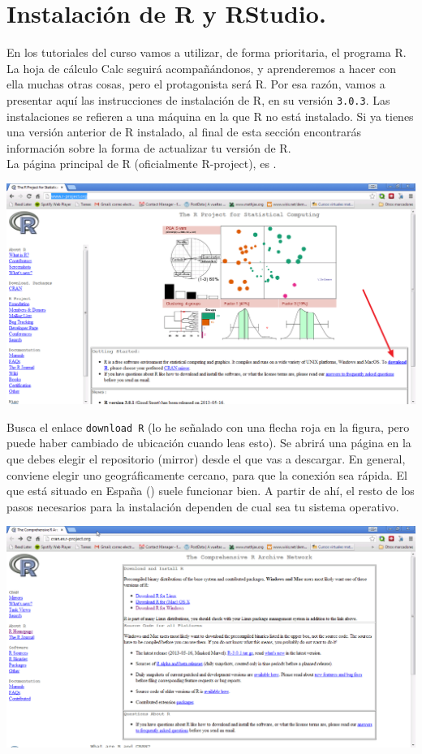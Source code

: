 \documentclass[10pt,a4paper]{article}\usepackage[]{graphicx}\usepackage[]{color}
\newcounter {cont01}
\begin{document}
\section{Instalación de R y RStudio.}

En los tutoriales del curso vamos a utilizar, de forma prioritaria, el programa R. La hoja de
cálculo Calc seguirá acompañándonos, y aprenderemos a hacer con ella muchas otras cosas, pero el
protagonista será R. Por esa razón, vamos a presentar aquí las instrucciones de instalación de R,
en su versión {\tt 3.0.3}. Las instalaciones se refieren a una máquina en la que R {\sf no está
instalado}.
Si ya tienes una versión anterior de R instalado, al final de esta sección encontrarás información sobre la forma de actualizar tu versión de R. \quad\\
La página principal de R (oficialmente R-project), es
.
    \begin{center}
    \includegraphics[width=15cm]{../fig/Tut00-35.png}
    \end{center}
Busca el enlace {\tt download R} (lo he señalado con una flecha roja en la figura, pero puede haber
cambiado de ubicación cuando leas esto). Se abrirá una página en la que debes elegir el repositorio
(mirror) desde el que vas a descargar. En general, conviene elegir uno geográficamente cercano,
para que la conexión sea rápida. El que está situado en España
() suele funcionar bien. A partir de
ahí, el resto de los pasos necesarios para la instalación dependen de cual sea tu sistema
operativo.
    \begin{center}
    \includegraphics[width=15cm]{../fig/Tut00-36.png}
    \end{center}
\end{document}
